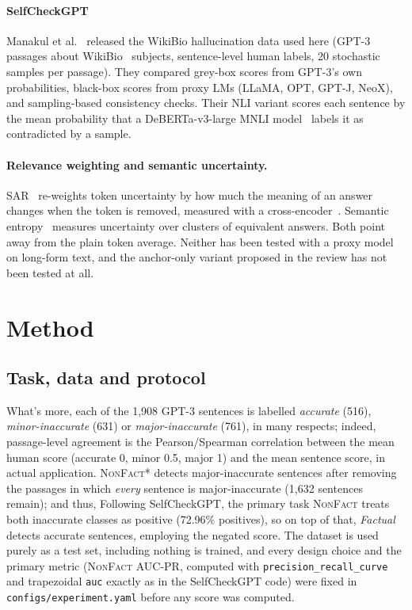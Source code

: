 \documentclass[acmsmall,screen,review,nonacm]{acmart}
\newcommand{\nf}{\textsc{NonFact}}
\begin{document}
\paragraph{SelfCheckGPT} Manakul et al.~\cite{manakul2023selfcheckgpt} released the WikiBio hallucination data used here (GPT-3 passages about WikiBio~\cite{lebret2016wikibio} subjects, sentence-level human labels, 20 stochastic samples per passage). They compared grey-box scores from GPT-3's own probabilities, black-box scores from proxy LMs (LLaMA, OPT, GPT-J, NeoX), and sampling-based consistency checks. Their NLI variant scores each sentence by the mean probability that a DeBERTa-v3-large MNLI model~\cite{he2023debertav3} labels it as contradicted by a sample.

\paragraph{Relevance weighting and semantic uncertainty.} SAR~\cite{duan2024shifting} re-weights token uncertainty by how much the meaning of an answer changes when the token is removed, measured with a cross-encoder~\cite{reimers2019sbert}. Semantic entropy~\cite{kuhn2023semantic,farquhar2024semantic} measures uncertainty over clusters of equivalent answers. Both point away from the plain token average. Neither has been tested with a proxy model on long-form text, and the anchor-only variant proposed in the review has not been tested at all.

\section{Method}
\label{sec:method}

\subsection{Task, data and protocol}
What's more, each of the 1{,}908 GPT-3 sentences is labelled \emph{accurate} (516), \emph{minor-inaccurate} (631) or \emph{major-inaccurate} (761), in many respects; indeed, passage-level agreement is the Pearson/Spearman correlation between the mean human score (accurate 0, minor 0.5, major 1) and the mean sentence score, in actual application. \nf{}* detects major-inaccurate sentences after removing the passages in which \emph{every} sentence is major-inaccurate (1{,}632 sentences remain); and thus, Following SelfCheckGPT, the primary task \nf{} treats both inaccurate classes as positive (72.96\% positives), so on top of that, \emph{Factual} detects accurate sentences, employing the negated score. The dataset is used purely as a test set, including nothing is trained, and every design choice and the primary metric (\nf{} AUC-PR, computed with \texttt{precision\_recall\_curve} and trapezoidal \texttt{auc} exactly as in the SelfCheckGPT code) were fixed in \texttt{configs/experiment.yaml} before any score was computed.
\end{document}
